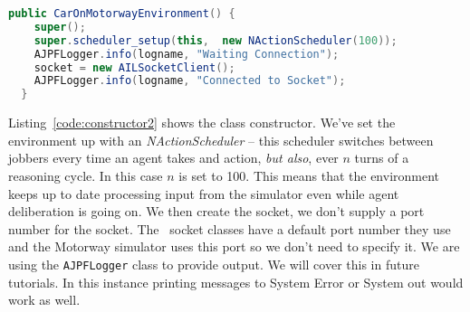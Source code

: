 \documentclass[a4]{article}
\begin{document}
\begin{lstlisting}[float,caption=Constructor,basicstyle=\sffamily,language=Java,label=code:constructor2,style=easslisting]
  public CarOnMotorwayEnvironment() {
    super();
    super.scheduler_setup(this,  new NActionScheduler(100));
    AJPFLogger.info(logname, "Waiting Connection");
    socket = new AILSocketClient();
    AJPFLogger.info(logname, "Connected to Socket");
  }
\end{lstlisting}
Listing~\ref{code:constructor2} shows the class constructor.  We've set the environment up with an \emph{NActionScheduler} -- this scheduler switches between jobbers every time an agent takes and action, \emph{but also}, ever $n$ turns of a reasoning cycle.  In this case $n$ is set to 100.  This means that the environment keeps up to date processing input from the simulator even while agent deliberation is going on.  We then create the socket, we don't supply a port number for the socket.  The \ail\ socket classes have a default port number they use and the Motorway simulator uses this port so we don't need to specify it.  We are using the \texttt{AJPFLogger} class to provide output.  We will cover this in future tutorials.  In this instance printing messages to System Error or System out would work as well.
\end{document}
